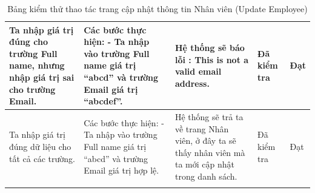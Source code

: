 \documentclass[a4paper]{article}
\begin{document}
\begin{longtable}{ | p{} |p{} | p{}  | p{}  | p{}  | }
\hline
Ta nhập giá trị đúng cho trường Full name, nhưng nhập giá trị sai cho trường Email. &
Các bước thực hiện: \newline
- Ta nhập vào trường Full name giá trị “abcd” và trường Email giá trị “abcdef”.  
&
Hệ thống sẽ báo lỗi : This is not a valid email address.
 &
Đã kiểm tra &
Đạt \\

\hline
Ta nhập giá trị đúng dữ liệu cho tất cả các trường. &
Các bước thực hiện: \newline
- Ta nhập vào trường Full name giá trị “abcd” và trường Email giá trị hợp lệ.  
&
Hệ thống sẽ trả ta về trang Nhân viên, ở đây ta sẽ thấy nhân viên mà ta mới cập nhật trong danh sách.
 &
Đã kiểm tra &
Đạt \\

\hline
\caption{Bảng kiểm thử thao tác trang cập nhật thông tin Nhân viên (Update Employee)}
\end{longtable}

\end{document}
